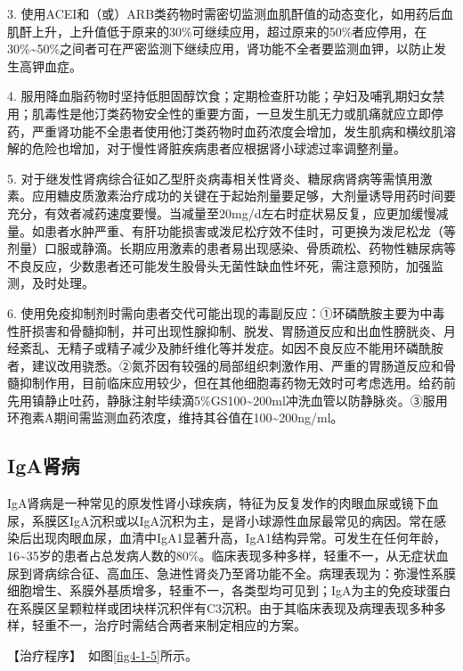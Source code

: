 3.
使用ACEI和（或）ARB类药物时需密切监测血肌酐值的动态变化，如用药后血肌酐上升，上升值低于原来的30\%可继续应用，超过原来的50\%者应停用，在30\%\textasciitilde{}50\%之间者可在严密监测下继续应用，肾功能不全者要监测血钾，以防止发生高钾血症。

4.
服用降血脂药物时坚持低胆固醇饮食；定期检查肝功能；孕妇及哺乳期妇女禁用；肌毒性是他汀类药物安全性的重要方面，一旦发生肌无力或肌痛就应立即停药，严重肾功能不全患者使用他汀类药物时血药浓度会增加，发生肌病和横纹肌溶解的危险也增加，对于慢性肾脏疾病患者应根据肾小球滤过率调整剂量。

5.
对于继发性肾病综合征如乙型肝炎病毒相关性肾炎、糖尿病肾病等需慎用激素。应用糖皮质激素治疗成功的关键在于起始剂量要足够，大剂量诱导用药时间要充分，有效者减药速度要慢。当减量至20mg/d左右时症状易反复，应更加缓慢减量。如患者水肿严重、有肝功能损害或泼尼松疗效不佳时，可更换为泼尼松龙（等剂量）口服或静滴。长期应用激素的患者易出现感染、骨质疏松、药物性糖尿病等不良反应，少数患者还可能发生股骨头无菌性缺血性坏死，需注意预防，加强监测，及时处理。

6.
使用免疫抑制剂时需向患者交代可能出现的毒副反应：①环磷酰胺主要为中毒性肝损害和骨髓抑制，并可出现性腺抑制、脱发、胃肠道反应和出血性膀胱炎、月经紊乱、无精子或精子减少及肺纤维化等并发症。如因不良反应不能用环磷酰胺者，建议改用骁悉。②氮芥因有较强的局部组织刺激作用、严重的胃肠道反应和骨髓抑制作用，目前临床应用较少，但在其他细胞毒药物无效时可考虑选用。给药前先用镇静止吐药，静脉注射毕续滴5\%GS100\textasciitilde{}200ml冲洗血管以防静脉炎。③服用环孢素A期间需监测血药浓度，维持其谷值在100\textasciitilde{}200ng/ml。

\subsection{IgA肾病}

IgA肾病是一种常见的原发性肾小球疾病，特征为反复发作的肉眼血尿或镜下血尿，系膜区IgA沉积或以IgA沉积为主，是肾小球源性血尿最常见的病因。常在感染后出现肉眼血尿，血清中IgA1显著升高，IgA1结构异常。可发生在任何年龄，16\textasciitilde{}35岁的患者占总发病人数的80\%。临床表现多种多样，轻重不一，从无症状血尿到肾病综合征、高血压、急进性肾炎乃至肾功能不全。病理表现为：弥漫性系膜细胞增生、系膜外基质增多，轻重不一，各类型均可见到；IgA为主的免疫球蛋白在系膜区呈颗粒样或团块样沉积伴有C3沉积。由于其临床表现及病理表现多种多样，轻重不一，治疗时需结合两者来制定相应的方案。

【治疗程序】　如图\ref{fig4-1-5}所示。

